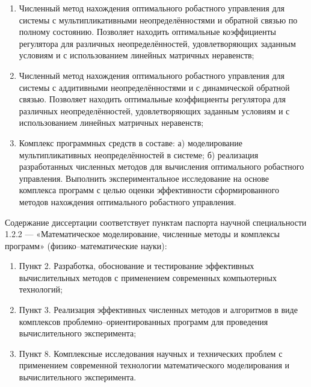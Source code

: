 {}

\begin{enumerate}[beginpenalty=10000] %
	\item Численный метод нахождения оптимального робастного управления для системы с мультипликативными неопределённостями и обратной связью по полному состоянию. Позволяет находить оптимальные коэффициенты регулятора для различных неопределённостей, удовлетворяющих заданным условиям и с использованием линейных матричных неравенств; 
	\item Численный метод нахождения оптимального робастного управления для системы с аддитивными неопределённостями и с динамической обратной связью. Позволяет находить оптимальные коэффициенты регулятора для различных неопределённостей, удовлетворяющих заданным условиям и с использованием линейных матричных неравенств; 
	\item Комплекс программных средств в составе: а) моделирование мультипликативных неопределённостей в системе; б) реализация разработанных численных методов для вычисления оптимального робастного управления. Выполнить экспериментальное исследование на основе комплекса программ с целью оценки эффективности сформированного методов нахождения оптимального робастного управления.
\end{enumerate}

{\compliances} 

Содержание диссертации соответствует пунктам паспорта научной специальности 1.2.2 --- «Математическое моделирование, численные методы и комплексы программ» (физико--математические науки):
\begin{enumerate}[beginpenalty=10000]
	\item Пункт 2. Разработка, обоснование и тестирование эффективных вычислительных методов с применением современных компьютерных технологий;
	\item Пункт 3. Реализация эффективных численных методов и алгоритмов в виде комплексов
	проблемно--ориентированных программ для проведения вычислительного
	эксперимента;
	\item Пункт 8. Комплексные исследования научных и технических проблем с применением
	современной технологии математического моделирования и вычислительного
	эксперимента.
\end{enumerate}

{\novelty}

